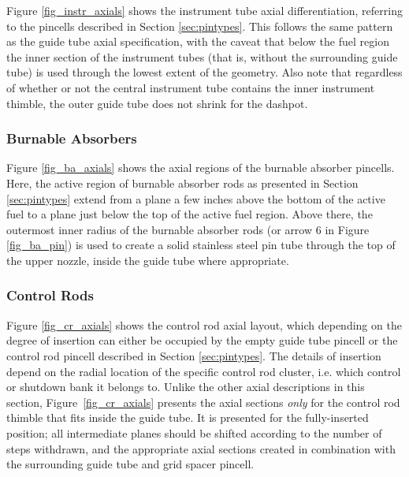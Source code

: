 Figure \ref{fig_instr_axials} shows the instrument tube axial differentiation,
referring to the pincells described in Section \ref{sec:pintypes}. This
follows the same pattern as the guide tube axial specification, with the caveat
that below the fuel region the inner section of the instrument tubes (that is,
without the surrounding guide tube) is used through the lowest extent of the
geometry.  Also note that regardless of whether or not the central instrument
tube contains the inner instrument thimble, the outer guide tube does not shrink
for the dashpot.


\subsubsection{Burnable Absorbers}

Figure \ref{fig_ba_axials} shows the axial regions of the burnable absorber
pincells. Here, the active region of burnable absorber rods as presented in
Section \ref{sec:pintypes} extend from a plane a few inches above the bottom of the
active fuel to a plane just below the top of the active fuel region. Above
there, the outermost inner radius of the burnable absorber rods (or arrow 6 in
Figure \ref{fig_ba_pin}) is used to create a solid stainless steel pin tube
through the top of the upper nozzle, inside the guide tube where appropriate.


\subsubsection{Control Rods}
\label{sec:axial_cr}

Figure \ref{fig_cr_axials} shows the control rod axial layout, which depending
on the degree of insertion can either be occupied by the empty guide tube
pincell or the control rod pincell described in Section \ref{sec:pintypes}. The
details of insertion depend on the radial location of the specific control rod
cluster, i.e. which control or shutdown bank it belongs to. Unlike the other
axial descriptions in this section, Figure~\ref{fig_cr_axials} presents the
axial sections \emph{only} for the control rod thimble that fits inside the
guide tube. It is presented for the fully-inserted position; all intermediate
planes should be shifted according to the number of steps withdrawn, and the
appropriate axial sections created in combination with the surrounding guide
tube and grid spacer pincell.

